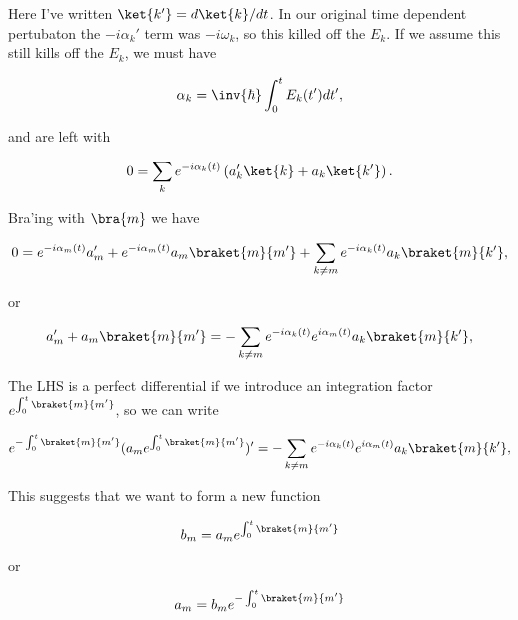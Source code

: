 Here I've written $\ket{k'} = d\ket{k}/dt$.  In our original time dependent pertubaton the $-i \alpha_k'$ term was $-i \omega_k$, so this killed off the $E_k$.  If we assume this still kills off the $E_k$, we must have

\begin{equation}\label{eqn:oneMoreAdiabatic:80}
\alpha_k = \inv{\hbar} \int_0^t E_k(t') dt',
\end{equation}

and are left with

\begin{equation}\label{eqn:oneMoreAdiabatic:90}
0
=
\sum_k e^{-i \alpha_k(t)} 
\left( 
a_k' \ket{k}
+
a_k \ket{k'}
\right).
\end{equation}

Bra'ing with $\bra{m}$ we have

\begin{equation}\label{eqn:oneMoreAdiabatic:100}
0
=
e^{-i \alpha_m(t)} 
a_m' 
+
e^{-i \alpha_m(t)} 
a_m \braket{m}{m'}
+
\sum_{k \ne m} e^{-i \alpha_k(t)} 
a_k \braket{m}{k'},
\end{equation}

or

\begin{equation}\label{eqn:oneMoreAdiabatic:110}
a_m' 
+
a_m \braket{m}{m'}
=
-
\sum_{k \ne m} e^{-i \alpha_k(t)} e^{i \alpha_m(t)} 
a_k \braket{m}{k'},
\end{equation}

The LHS is a perfect differential if we introduce an integration factor $e^{\int_0^t \braket{m}{m'}}$, so we can write

\begin{equation}\label{eqn:oneMoreAdiabatic:130}
e^{-\int_0^t \braket{m}{m'}} ( a_m e^{\int_0^t \braket{m}{m'} } )'
=
-
\sum_{k \ne m} e^{-i \alpha_k(t)} e^{i \alpha_m(t)} 
a_k \braket{m}{k'},
\end{equation}

This suggests that we want to form a new function

\begin{equation}\label{eqn:oneMoreAdiabatic:150}
b_m = a_m e^{\int_0^t \braket{m}{m'} } 
\end{equation}

or

\begin{equation}\label{eqn:oneMoreAdiabatic:170}
a_m = b_m e^{-\int_0^t \braket{m}{m'} } 
\end{equation}

